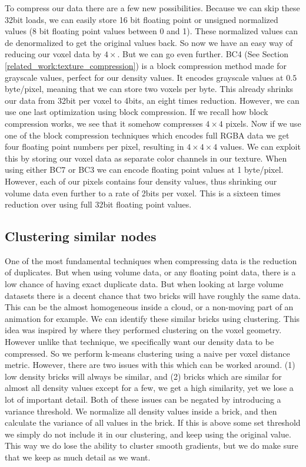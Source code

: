 To compress our data there are a few new possibilities. Because we can skip these 32bit loads, we can easily store 16 bit floating point or unsigned normalized values (8 bit floating point values between 0 and 1). These normalized values can de denormalized to get the original values back. So now we have an easy way of reducing our voxel data by $4\times$. But we can go even further. BC4 (See Section \ref{related_work:texture_compression}) is a block compression method made for grayscale values, perfect for our density values. It encodes grayscale values at $0.5$ byte/pixel, meaning that we can store two voxels per byte. This already shrinks our data from 32bit per voxel to 4bits, an eight times reduction. However, we can use one last optimization using block compression. If we recall how block compression works, we see that it somehow compresses $4\times 4$ pixels. Now if we use one of the block compression techniques which encodes full RGBA data we get four floating point numbers per pixel, resulting in $4 \times 4 \times 4$ values. We can exploit this by storing our voxel data as separate color channels in our texture. When using either BC7 or BC3 we can encode floating point values at 1 byte/pixel. However, each of our pixels contains four density values, thus shrinking our volume data even further to a rate of 2bits per voxel. This is a sixteen times reduction over using full 32bit floating point values.

\subsection{Clustering similar nodes} \label{approach:clustering_similar_nodes}
One of the most fundamental techniques when compressing data is the reduction of duplicates. But when using volume data, or any floating point data, there is a low chance of having exact duplicate data. But when looking at large volume datasets there is a decent chance that two bricks will have roughly the same data. This can be the almost homogeneous inside a cloud, or a non-moving part of an animation for example. We can identify these similar bricks using clustering. This idea was inspired by \cite{van2020lossy} where they performed clustering on the voxel geometry. However unlike that technique, we specifically want our density data to be compressed. So we perform k-means clustering using a naive per voxel distance metric. However, there are two issues with this which can be worked around. (1) low density bricks will always be similar, and (2) bricks which are similar for almost all density values except for a few, we get a high similarity, yet we lose a lot of important detail. Both of these issues can be negated by introducing a variance threshold. We normalize all density values inside a brick, and then calculate the variance of all values in the brick. If this is above some set threshold we simply do not include it in our clustering, and keep using the original value. This way we do lose the ability to cluster smooth gradients, but we do make sure that we keep as much detail as we want.